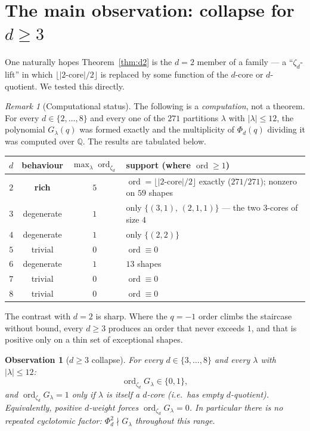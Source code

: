 \documentclass[11pt]{article}
\newtheorem{observation}{Observation}
\theoremstyle{definition}
\theoremstyle{remark}
\newtheorem*{remark}{Remark}
\newcommand{\ord}{\operatorname{ord}}
\newcommand{\Q}{\mathbb{Q}}
\begin{document}
\section{The main observation: collapse for $d \ge 3$}

One naturally hopes Theorem~\ref{thm:d2} is the $d=2$ member of a family --- a
``$\zeta_d$-lift'' in which $\lfloor |2\text{-core}|/2\rfloor$ is replaced by some
function of the $d$-core or $d$-quotient. We tested this directly.

\begin{remark}[Computational status]
The following is a \emph{computation}, not a theorem. For every $d \in \{2,\dots,8\}$
and every one of the $271$ partitions $\lambda$ with $|\lambda| \le 12$, the polynomial
$G_\lambda(q)$ was formed exactly and the multiplicity of $\Phi_d(q)$ dividing it was
computed over $\Q$. The results are tabulated below.
\end{remark}

\begin{center}
\renewcommand{\arraystretch}{1.25}
\begin{tabular}{c|c|c|l}
$d$ & behaviour & $\max_\lambda \ord_{\zeta_d}$ & support (where $\ord \ge 1$) \\
\hline
$2$ & \textbf{rich} & $5$ & $\ord = \lfloor |2\text{-core}|/2\rfloor$ exactly ($271/271$); nonzero on $59$ shapes\\
$3$ & degenerate & $1$ & only $\{(3,1),\,(2,1,1)\}$ --- the two $3$-cores of size $4$\\
$4$ & degenerate & $1$ & only $\{(2,2)\}$\\
$5$ & trivial & $0$ & $\ord \equiv 0$ \\
$6$ & degenerate & $1$ & $13$ shapes\\
$7$ & trivial & $0$ & $\ord \equiv 0$ \\
$8$ & trivial & $0$ & $\ord \equiv 0$ \\
\end{tabular}
\end{center}

The contrast with $d=2$ is sharp. Where the $q=-1$ order climbs the staircase without
bound, every $d \ge 3$ produces an order that never exceeds $1$, and that is positive
only on a thin set of exceptional shapes.

\begin{observation}[$d \ge 3$ collapse]
\label{obs:collapse}
For every $d \in \{3,\dots,8\}$ and every $\lambda$ with $|\lambda| \le 12$:
\[
\ord_{\zeta_d} G_\lambda \in \{0,1\},
\]
and $\ord_{\zeta_d} G_\lambda = 1$ only if $\lambda$ is itself a $d$-core (i.e.\ has
empty $d$-quotient). Equivalently, \emph{positive $d$-weight forces
$\ord_{\zeta_d} G_\lambda = 0$.} In particular there is no repeated cyclotomic factor:
$\Phi_d^2 \nmid G_\lambda$ throughout this range.
\end{observation}
\end{document}
